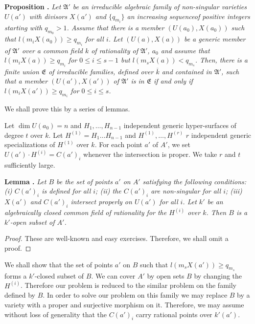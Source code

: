 \smallskip
\noindent
{\bf Proposition .\label{art14-app-prop1.1}}
{\em Let $\mathfrak{A}'$ be an irreducible algebraic family of non-sin\-gular varieties $U(a')$ with divisors $X(a')$ and $\{q_{m_{i}}\}$ an increasing sequence\pageoriginale of positive integers starting with $q_{m_{0}}>1$. Assume that there is a member $(U(a_{0}), X(a_{0}))$ such that $l(m_{i}X(a_{0}))\geq q_{m_{i}}$ for all $i$. Let $(U(a), X(a))$ be a generic member of $\mathfrak{A}'$ over a common field $k$ of rationality of $\mathfrak{A}'$, $a_{0}$ and assume that $l(m_{i}X(a))\geq q_{m_{i}}$ for $0\leq i\leq s-1$ but $l(m_{s}X(a))<q_{m_{s}}$. Then, there is a finite union $\mathfrak{E}$ of irreducible families, defined over $\overline{k}$ and contained in $\mathfrak{A}'$, such that a member $(U(a'),X(a'))$ of $\mathfrak{A}'$ is in $\mathfrak{E}$ if and only if $l(m_{i}X(a'))\geq q_{m_{i}}$ for $0\leq i\leq s$.}
\smallskip

We shall prove this by a series of lemmas.

Let $\dim U(a_{0})=n$ and $H_{1},\ldots,H_{n-1}$ independent generic hyper-surfaces of degree $t$ over $k$. Let $H^{(1)}=H_{1}\ldots H_{n-1}$ and $H^{(1)},\ldots,H^{(r)}$ $r$ independent generic specializations of $H^{(1)}$ over $k$. For each point $a'$ of $A'$, we set $U(a')\cdot H^{(i)}=C(a')_{i}$ whenever the intersection is proper. We take $r$ and $t$ sufficiently large.

\medskip
\noindent
{\bf Lemma .\label{art14-app-lem1.2}}
{\em Let $B$ be the set of points $a'$ on $A'$ satisfying the following conditions: {\rm(i)} $C(a')_{i}$ is defined for all $i$; {\rm(ii)} the $C(a')_{i}$ are non-singular for all $i$; {\rm(iii)} $X(a')$ and $C(a')_{i}$ intersect properly on $U(a')$ for all $i$. Let $k'$ be an algebraically closed common field of rationality for the $H^{(i)}$ over $k$. Then $B$ is a $k'$-open subset of $A'$.}

\begin{proof}
These are well-known and easy exercises. Therefore, we shall omit a proof.
\end{proof}

We shall show that the set of points $a'$ on $B$ such that $l(m_{s}X(a'))\geq q_{m_{s}}$ forms a $k'$-closed subset of $B$. We can cover $A'$ by open sets $B$ by changing the $H^{(i)}$. Therefore our problem is reduced to the similar problem on the family defined by $B$. In order to solve our problem on this family we may replace $B$ by a variety with a proper and surjective morphism on it. Therefore, we may assume without loss of generality that the $C(a')_{i}$ carry rational points over $k'(a')$.

